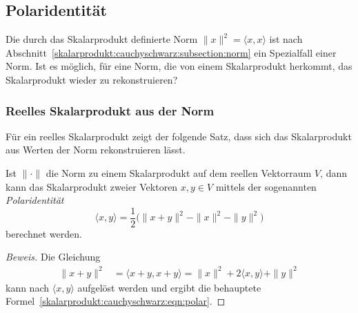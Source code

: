 %
%
\subsection{Polaridentität}
Die durch das Skalarprodukt definierte Norm
\( \|x\|^2=\langle x,x\rangle \)
ist nach Abschnitt~\ref{skalarprodukt:cauchyschwarz:subsection:norm}
ein Spezialfall einer Norm.
Ist es möglich, für eine Norm, die von einem Skalarprodukt herkommt,
das Skalarprodukt wieder zu rekonstruieren?

%
%
\subsubsection{Reelles Skalarprodukt aus der Norm}
Für ein reelles Skalarprodukt zeigt der folgende Satz, dass sich
das Skalarprodukt aus Werten der Norm rekonstruieren lässt.

\begin{satz}[Polaridentität]
\label{skalarprodukt:cauchyschwarz:satz:polarformel}
%
Ist $\|\cdot\|$ die Norm zu einem Skalarprodukt auf dem reellen Vektorraum
$V$, dann kann das Skalarprodukt zweier Vektoren $x,y\in V$ mittels
der sogenannten {\em Polaridentität}
%
\begin{equation}
\langle x, y\rangle
=
\frac12\bigl(
\|x+y\|^2 - \|x\|^2 - \|y\|^2 
\bigr)
\label{skalarprodukt:cauchyschwarz:eqn:polar}
\end{equation}
berechnet werden.
\end{satz}

\begin{proof}[Beweis]
Die Gleichung
\begin{align*}
\|x+y\|^2
&=
\langle x+y,x+y\rangle
=
\|x\|^2 + 2\langle x,y\rangle + \|y\|^2 
\end{align*}
kann nach $\langle x,y\rangle$ aufgelöst werden und ergibt
die behauptete Formel~\eqref{skalarprodukt:cauchyschwarz:eqn:polar}.
\end{proof}

% 
%
